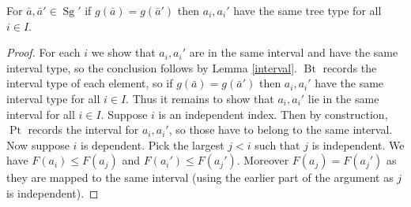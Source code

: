 \documentclass{amsart}
\DeclareMathOperator{\Sg}{Sg}
\DeclareMathOperator{\Bt}{Bt}
\DeclareMathOperator{\Pt}{Pt}
\begin{document}
\begin{Lemma}
	For $\bar a, \bar a' \in \Sg'$ if $g(\bar a) = g(\bar a')$ then $a_i, a_i'$ have the same tree type for all $i \in I$.	
\end{Lemma}

\begin{proof}
	For each $i$ we show that $a_i, a_i'$ are in the same interval and have the same interval type, so the conclusion follows by Lemma \ref{interval}.
	$\Bt$ records the interval type of each element, so if $g(\bar a) = g(\bar a')$ then $a_i, a_i'$ have the same interval type for all $i \in I$.
	Thus it remains to show that $a_i, a_i'$ lie in the same interval for all $i \in I$.
	Suppose $i$ is an independent index.
	Then by construction, $\Pt$ records the interval for $a_i, a_i'$, so those have to belong to the same interval.
	Now suppose $i$ is dependent.
	Pick the largest $j < i$ such that $j$ is independent.
	We have $F(a_i) \leq F(a_j)$ and $F(a_i') \leq F(a_j')$.
	Moreover $F(a_j) = F(a_j')$ as they are mapped to the same interval (using the earlier part of the argument as $j$ is independent).
	

\end{proof}
\end{document}
